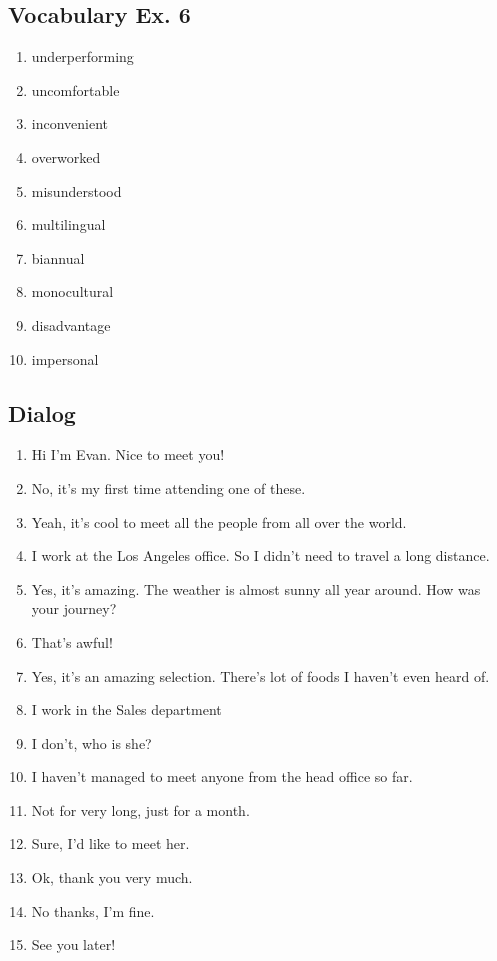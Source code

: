 \documentclass[12pt, a4paper, oneside]{article}
\begin{document}
  \subsection{Vocabulary Ex. 6}
  \begin{enumerate}[1.]
    \item underperforming
    \item uncomfortable
    \item inconvenient
    \item overworked
    \item misunderstood
    \item multilingual
    \item biannual
    \item monocultural
    \item disadvantage
    \item impersonal
  \end{enumerate}

  \subsection{Dialog} 
  \begin{enumerate}[1.] 
    \item Hi I'm Evan. Nice to meet you!
    \item No, it's my first time attending one of these.
    \item Yeah, it's cool to meet all the people from all over the world.
    \item I work at the Los Angeles office. So I didn't need to travel a long distance.
    \item Yes, it's amazing. The weather is almost sunny all year around. How was your journey?
    \item That's awful!
    \item Yes, it's an amazing selection. There's lot of foods I haven't even heard of.
    \item I work in the Sales department
    \item I don't, who is she?
    \item I haven't managed to meet anyone from the head office so far.
    \item Not for very long, just for a month.
    \item Sure, I'd like to meet her.
    \item Ok, thank you very much.
    \item No thanks, I'm fine.
    \item See you later!

  \end{enumerate}
\end{document}
